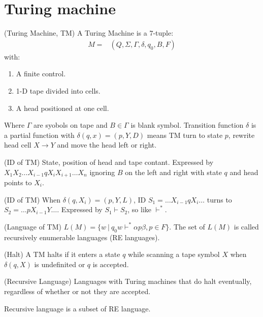 
\usepackage{../../lectures_preamble}


    \section{Turing machine}
    \begin{definition}
        (Turing Machine, TM) A Turing Machine is a $7$-tuple:
        \begin{align}
            M=&\left( Q,\Sigma,\Gamma,\delta,q_0,B,F \right) \nonumber
        \end{align}
        with:
        \begin{enumerate}
            \item A finite control.
            \item 1-D tape divided into cells.
            \item A head positioned at one cell.
        \end{enumerate}
        Where $\Gamma$ are syobols on tape and $B\in \Gamma$ is blank symbol. Transition function $\delta$ is a partial function with $\delta\left( q,x \right) =\left( p,Y,D \right) $ means TM turn to state $p$, rewrite head cell $X\rightarrow Y$ and move the head left or right.
    \end{definition}
    \begin{definition}
        (ID of TM) State, position of head and tape contant. Expressed by $X_1X_2\ldots X_{i-1}qX_{i}X_{i+1}\ldots X_{n}$ ignoring $B$ on the left and right with state $q$ and head points to $X_{i}$.
    \end{definition}
    \begin{example}
        (ID of TM) When $\delta\left( q,X_{i} \right) =\left( p,Y,L \right) $, ID $S_1=\ldots X_{i-1}qX_{i}\ldots $ turns to $S_2=\ldots pX_{i-1}Y\ldots $. Expressed by $S_1\vdash S_2$, so like $\vdash^{*}$.
    \end{example}
    \begin{definition}
        (Language of TM) $L\left( M \right) =\{w\ |\ q_0w\vdash^{*}\alpha p\beta,p\in F\}$. The set of $L\left( M \right) $ is called recursively enumerable languages (RE languages).
    \end{definition}
    \begin{definition}
        (Halt) A TM halts if it enters a state $q$ while scanning a tape symbol $X$ when $\delta\left( q,X \right) $ is undefinited or $q$ is accepted.
    \end{definition}
    \begin{definition}
        (Recursive Language) Languages with Turing machines that do halt eventually, regardless of whether or not they are accepted.
    \end{definition}
    Recursive language is a subset of RE language.

